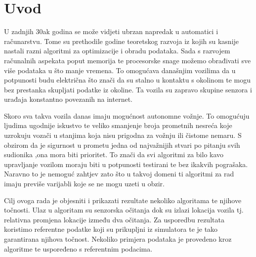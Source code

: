 \chapter{Uvod}

U zadnjih 30ak godina se može vidjeti ubrzan napredak u automatici i računarstvu. Tome su prethodile godine teoretskog razvoja iz kojih su kasnije nastali razni algoritmi za optimizacije i obradu podataka. Sada s razvojem računalnih aspekata poput memorija te procesorske snage možemo obrađivati sve više podataka u što manje vremena. To omogućava današnjim vozilima da u potpunosti budu električna što znači da su stalno u kontaktu s okolinom te mogu bez prestanka skupljati podatke iz okoline. Ta vozila su zapravo skupine senzora i urađaja konstantno povezanih na internet.

Skoro sva takva vozila danas imaju mogućnost autonomne vožnje. To omogućuju ljudima ugodnije iskustvo te veliko smanjenje broja prometnih nesreća koje uzrokuju vozači u stanjima koja nisu prigodna za vožnju ili čistome nemaru. S obzirom da je sigurnost u prometu jedna od najvažnijih stvari po pitanju svih sudionika ,ona mora biti prioritet. To znači da svi algoritmi za bilo kavo upravljanje vozilom moraju biti u potpunosti testirani te bez ikakvih pograšaka. Naravno to je nemoguć zahtjev zato što u takvoj domeni ti algoritmi za rad imaju previše varijabli koje se ne mogu uzeti u obzir. 

Cilj ovoga rada je objesniti i prikazati rezultate nekoliko algoritama te njihove točnosti. Ulaz u algoritam su senzorska očitanja dok su izlazi lokacija vozila tj. relativna promjena lokacije između dva očitanja. Za usporedbu rezultata koristimo referentne podatke koji su prikupljni iz simulatora te je tako garantirana njihova točnost. Nekoliko primjera podataka je provedeno kroz algoritme te uspoređeno s referentnim podacima.
